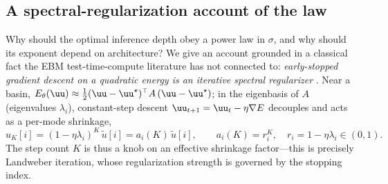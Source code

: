 %

\subsection{A spectral-regularization account of the law}
\label{sec:theory}

Why should the optimal inference depth obey a power law in $\sigma$, and why should
its exponent depend on architecture? We give an account grounded in a classical fact
the EBM test-time-compute literature has not connected to: \emph{early-stopped gradient
descent on a quadratic energy is an iterative spectral regularizer}
\citep{engl1996regularization, yao2007early, raskutti2014early}. Near a basin,
$E_\theta(\uu)\approx \tfrac12 (\uu-\uu^\star)^\top A\,(\uu-\uu^\star)$; in the eigenbasis
of $A$ (eigenvalues $\lambda_i$), constant-step descent
$\uu_{t+1}=\uu_t-\eta\nabla E$ decouples and acts as a per-mode shrinkage,
\begin{equation}
u_K[i] = (1-\eta\lambda_i)^K\,\tilde u[i] = a_i(K)\,\tilde u[i],
\qquad a_i(K)=r_i^K,\quad r_i = 1-\eta\lambda_i\in(0,1).
\end{equation}
The step count $K$ is thus a knob on an effective shrinkage factor---this is precisely
Landweber iteration, whose regularization strength is governed by the stopping index.

